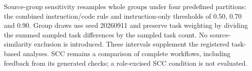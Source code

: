 Source-group sensitivity resamples whole groups under four predefined partitions: the combined instruction/code rule and instruction-only thresholds of 0.50, 0.70 and 0.90. Group draws use seed 20260911 and preserve task weighting by dividing the summed sampled task differences by the sampled task count. No source-similarity exclusion is introduced. These intervals supplement the registered task-based analyses. SCC remains a comparison of complete workflows, including feedback from its generated checks; a role-excised SCC condition is not evaluated.
